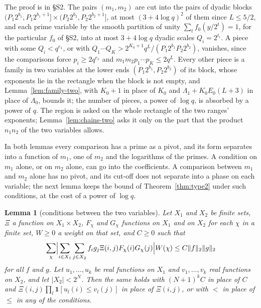 \documentclass[11pt]{article}
\newtheorem{lemma}[theorem]{Lemma}
\theoremstyle{definition}
\begin{document}
The proof is in \S S2. The pairs $(m_1, m_2)$ are cut into the pairs of dyadic blocks $(P_1 2^{b_1}, P_1 2^{b_1 + 1}]
\times (P_2 2^{b_2}, P_2 2^{b_2 + 1}]$, at most $(3 + 4 \log q)^2$ of them since $L \le 5/2$, and each prime variable by
the smooth partition of unity $\sum_t f_0(y/2^t) = 1$, for the particular $f_0$ of \S S2, into at
most $3 + 4 \log q$ dyadic scales $Q_i = 2^{t_i}$. A piece
with some $Q_i < q^{e_1}$, or with $Q_1 \cdots Q_K > 2^{K_0 + 1} q^L/(P_1 2^{b_1} P_2 2^{b_2})$, vanishes, since the
comparisons force $p_i \ge 2q^{e_1}$ and $m_1 m_2 p_1 \cdots p_K \le 2q^L$. Every other piece is a family in two
variables at the lower ends $(P_1 2^{b_1}, P_2 2^{b_2})$ of its block, whose exponents lie in the rectangle when the
block is not empty, and Lemma~\ref{lem:family-two}, with $K_0 + 1$ in place of $K_0$ and $\Lambda_1 + K_0 E_0 (L + 3)$
in place of $\Lambda_0$, bounds it; the number of pieces, a power of $\log q$, is absorbed by a power of $q$. The region
is asked on the whole rectangle of the two ranges' exponents; Lemma~\ref{lem:chains-two} asks it only on the part that
the product $n_1 n_2$ of the two variables allows.

In both lemmas every comparison has a prime as a pivot, and its form separates into a function of $m_1$, one of $m_2$
and the logarithms of the primes. A condition on $m_1$ alone, or on $m_2$ alone, can go into the coefficients. A
comparison between $m_1$ and $m_2$ alone has no pivot, and its cut-off does not separate into a phase on each variable;
the next lemma keeps the bound of Theorem~\ref{thm:type2} under such conditions, at the cost of a power of $\log q$.

\begin{lemma}[conditions between the two variables]\label{lem:cross}
Let $X_1$ and $X_2$ be finite sets, $\Xi$ a function on $X_1 \times X_2$, $F_\chi$ and $G_\chi$ functions on $X_1$ and
on
$X_2$ for each $\chi$ in a finite set, $W \ge 0$ a weight on that set, and $C \ge 0$ such that
\[
  \sum_\chi \Bigl|\sum_{i \in X_1} \sum_{j \in X_2} f_i g_j \Xi(i, j) F_\chi(i) G_\chi(j)\Bigr| W(\chi)
  \le C \|f\|_2 \|g\|_2
\]
for all $f$ and $g$. Let $u_1, \dots, u_k$ be real functions on $X_1$ and $v_1, \dots, v_k$ real functions on $X_2$,
and let $|X_2| < 2^N$. Then the same holds with $(N + 1)^k C$ in place of $C$ and $\Xi(i, j) \prod_l \mathbf 1[u_l(i)
\le v_l(j)]$ in place of $\Xi(i, j)$, or with $<$ in place of $\le$ in any of the conditions.
\end{lemma}
\end{document}
